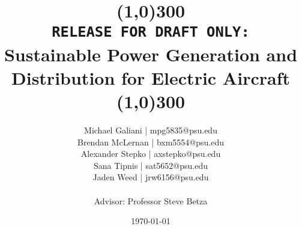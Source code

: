 \documentclass[12pt]{article}
\title{\line(1,0){300}\\\texttt{RELEASE FOR DRAFT ONLY:}\\Sustainable Power Generation and Distribution for Electric Aircraft\\\line(1,0){300}}
\author{
    Michael Galiani | mpg5835@psu.edu\\
    Brendan McLernan | bxm5554@psu.edu\\
    Alexander Stepko | axstepko@psu.edu\\
    Sana Tipnis | sat5652@psu.edu\\
    Jaden Weed | jrw6156@psu.edu\\~\\
    Advisor: Professor Steve Betza
}
\affil{The Pennsylvania State University}
\date{\today}
\begin{document}
\begin{titlepage}
 \maketitle                   %
\end{titlepage}
\newpage
\raggedright
\parindent15pt




\newpage
\renewcommand\contentsname{Table of Contents} %
\tableofcontents %
\let\tableofcontents\relax

\newpage


\newpage


\newpage


\newpage


\newpage



\end{document}
